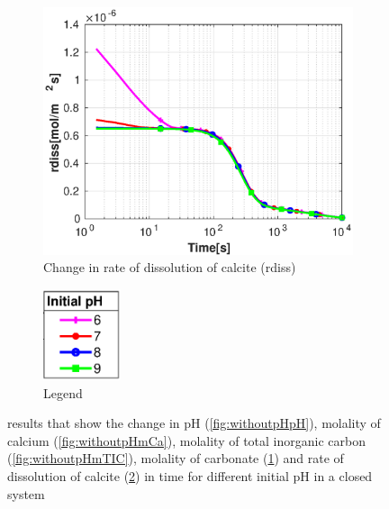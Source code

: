 \begin{figure}[!h]
\begin{subfigure}{.5\linewidth}
        \label{fig:withoutpHmCO3}
    \end{subfigure}%
    \hfill
    \begin{subfigure}{.5\linewidth}
            \centering
        \includegraphics[width=\textwidth]{PICTURES/without_pH_rdiss.eps}
        \caption{Change in rate of dissolution of calcite (rdiss)}
        \label{fig:withoutpHrdiss}
    \end{subfigure}%
  \hfill
  \begin{subfigure}{.5\linewidth}
            \centering
        \includegraphics[width=0.25\textwidth]{PICTURES/with_pH_legend.eps}
        \caption{Legend}
        \label{fig:withoutpHlegend}
    \end{subfigure}%
    \caption{\DuMuX results that show the change in pH (\cref{fig:withoutpHpH}), molality of calcium (\cref{fig:withoutpHmCa}), 
    molality of total inorganic carbon (\cref{fig:withoutpHmTIC}), molality of carbonate (\cref{fig:withoutpHmCO3}) 
    and rate of dissolution of calcite (\cref{fig:withoutpHrdiss}) in time for different initial pH in a closed system}
    
    \label{fig:comparisionWithoutDiffInitialpH}
\end{figure}

